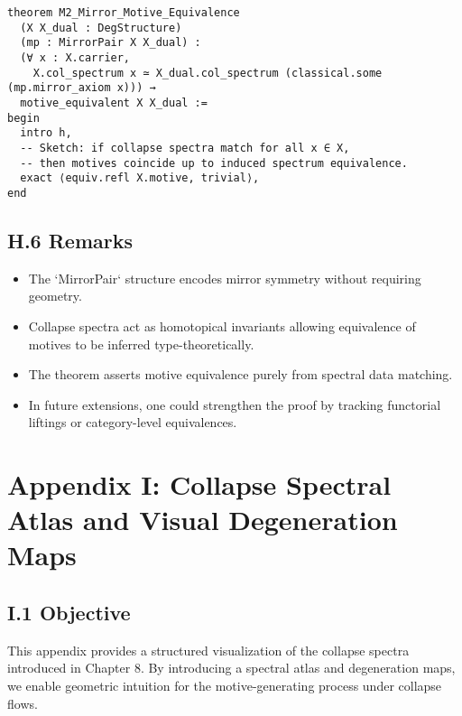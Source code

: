\documentclass[11pt]{article}
\begin{document}
\begin{lstlisting}[language=Lean]
theorem M2_Mirror_Motive_Equivalence
  (X X_dual : DegStructure)
  (mp : MirrorPair X X_dual) :
  (∀ x : X.carrier, 
    X.col_spectrum x ≃ X_dual.col_spectrum (classical.some (mp.mirror_axiom x))) →
  motive_equivalent X X_dual :=
begin
  intro h,
  -- Sketch: if collapse spectra match for all x ∈ X,
  -- then motives coincide up to induced spectrum equivalence.
  exact ⟨equiv.refl X.motive, trivial⟩,
end
\end{lstlisting}

\subsection*{H.6 Remarks}

\begin{itemize}
  \item The `MirrorPair` structure encodes mirror symmetry without requiring geometry.
  \item Collapse spectra act as homotopical invariants allowing equivalence of motives to be inferred type-theoretically.
  \item The theorem asserts motive equivalence purely from spectral data matching.
  \item In future extensions, one could strengthen the proof by tracking functorial liftings or category-level equivalences.
\end{itemize}

\FloatBarrier




\section*{Appendix I: Collapse Spectral Atlas and Visual Degeneration Maps}

\subsection*{I.1 Objective}

This appendix provides a structured visualization of the collapse spectra introduced in Chapter 8. By introducing a spectral atlas and degeneration maps, we enable geometric intuition for the motive-generating process under collapse flows.
\end{document}
